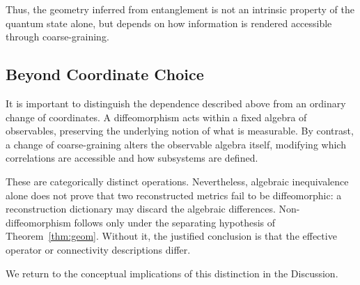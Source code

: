 \documentclass[12pt,a4paper]{article}
\begin{document}
Thus, the geometry inferred from entanglement is not an intrinsic property of the quantum state alone, but depends on how information is rendered accessible through coarse-graining.

\subsection{Beyond Coordinate Choice}

It is important to distinguish the dependence described above from an ordinary change of coordinates.
A diffeomorphism acts within a fixed algebra of observables, preserving the underlying notion of what is measurable.
By contrast, a change of coarse-graining alters the observable algebra itself, modifying which correlations are accessible and how subsystems are defined.

These are categorically distinct operations.  Nevertheless, algebraic inequivalence alone does not prove that two reconstructed metrics fail to be diffeomorphic: a reconstruction dictionary may discard the algebraic differences.  Non-diffeomorphism follows only under the separating hypothesis of Theorem~\ref{thm:geom}.  Without it, the justified conclusion is that the effective operator or connectivity descriptions differ.

We return to the conceptual implications of this distinction in the Discussion.
\end{document}
